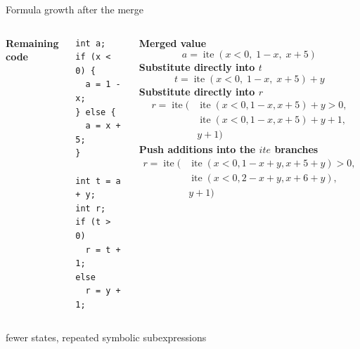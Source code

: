 \documentclass[english,aspectratio=169,t]{beamer}
\begin{document}
\begin{frame}[fragile]{Formula growth after the merge}
  \begin{columns}[T,onlytextwidth]
      \textbf{Remaining code}\par\vspace{-0.3em}
      \begin{lstlisting}[style=cppcode,basicstyle=\ttfamily\fontsize{5.15}{5.75}\selectfont]
int a;
if (x < 0) {
  a = 1 - x;
} else {
  a = x + 5;
}

int t = a + y;
int r;
if (t > 0)
  r = t + 1;
else
  r = y + 1;

      \end{lstlisting}
      \small
      \textbf{Merged value}
      \[
        a=\operatorname{ite}(x<0,\;1-x,\;x+5)
      \]
      \vspace{-0.75em}
      \textbf{Substitute directly into $t$}
      \[
        t=\operatorname{ite}(x<0,\;1-x,\;x+5)+y
      \]
      \vspace{-0.75em}
      \textbf{Substitute directly into $r$}
      {\scriptsize
      \[
      \begin{aligned}
      r=\operatorname{ite}(&\operatorname{ite}(x<0,1-x,x+5)+y>0,\\
                           &\operatorname{ite}(x<0,1-x,x+5)+y+1,\\
                           &y+1)
      \end{aligned}
      \]
      }
      \vspace{-0.85em}
      \textbf{Push additions into the $ite$ branches}
      {\scriptsize
      \[
      \begin{aligned}
      r=\operatorname{ite}(&\operatorname{ite}(x<0,1-x+y,x+5+y)>0,\\
                           &\operatorname{ite}(x<0,2-x+y,x+6+y),\\
                           &y+1)
      \end{aligned}
      \]
      }
  \end{columns}
  \vspace{-0.45em}
  \begin{center}\small fewer states, repeated symbolic subexpressions\end{center}
\end{frame}
\end{document}
